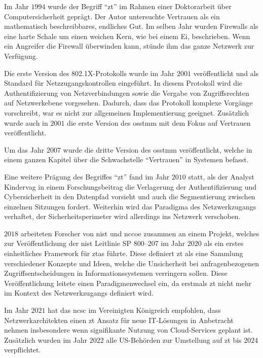 Im Jahr $1994$ wurde der Begriff \enquote{\ac{zt}} im Rahmen einer Doktorarbeit über Computersicherheit geprägt.
Der Autor untersuchte Vertrauen als ein mathematisch beschreibbares, endliches Gut.\autocite[\vglf][]{marsh-1994}
Im selben Jahr wurden Firewalls als eine harte Schale um einen weichen Kern, wie bei einem Ei, beschrieben.
Wenn ein Angreifer die Firewall überwinden kann, stünde ihm das ganze Netzwerk zur Verfügung. \autocite[\vglf][]{world-1994}

Die erste Version des 802.1X-Protokolls\autocite[\vglf][]{IEEE-2001} wurde im Jahr $2001$ veröffentlicht und als Standard für Netzzugangskontrollen eingeführt.
In diesem Protokoll wird die Authentifizierung von Netzverbindungen sowie die Vergabe von Zugriffsrechten auf Netzwerkebene vorgesehen.
Dadurch, dass das Protokoll komplexe Vorgänge vorschreibt, war es nicht zur allgemeinen Implementierung geeignet.\autocite[\vglf][]{zscaler-2022b}
Zusätzlich wurde auch in $2001$ die erste Version des \ac{osstmm} mit dem Fokus auf Vertrauen veröffentlicht.\autocite[\vglf][]{osstmm-2001}

Um das Jahr $2007$ wurde die dritte Version des \ac{osstmm} veröffentlicht, welche in einem ganzen Kapitel über die Schwachstelle \enquote{Vertrauen} in Systemen befasst.\autocite[\vglf][]{osstmm-2010}

Eine weitere Prägung des Begriffes \enquote{\ac{zt}} fand im Jahr $2010$ statt, als der Analyst Kindervag in einem Forschungsbeitrag die Verlagerung der Authentifizierung und Cybersicherheit in den Datenpfad vorsieht und auch die Segmentierung zwischen einzelnen Sitzungen fordert.
Weiterhin wird das Paradigma des Netzwerkzugangs verhaftet, der Sicherheitsperimeter wird allerdings ins Netzwerk verschoben.\autocites[\vglf][]{zscaler-2022b}[\vglf][]{kindervag-2010}

$2018$ arbeiteten Forscher von \ac{nist} und \ac{nccoe} zusammen an einem Projekt, welches zur Veröffentlichung der \ac{nist} Leitlinie SP 800--207\autocite{NIST:800207} im Jahr $2020$ als ein erstes einheitliches Framework für \acp{zta} führte.
Diese definiert \ac{zt} als eine Sammlung verschiedener Konzepte und Ideen, welche die Unsicherheit bei anfragenbezogenen Zugriffsentscheidungen in Informationssystemen verringern sollen.
Diese Veröffentlichung leitete einen Paradigmenwechsel ein, da erstmals \ac{zt} nicht mehr im Kontext des Netzwerkzugangs definiert wird.\autocite[\vglf][]{zscaler-2022b}

Im Jahr $2021$ hat das \ac{ncsc} im Vereinigten Königreich empfohlen, dass Netzwerkarchitekten einen \ac{zt} Ansatz für neue IT-Lösungen in Anbetracht nehmen insbesondere wenn signifikante Nutzung von Cloud-Services geplant ist.\autocite{ncsc-2021}
Zusätzlich wurden im Jahr $2022$ alle US-Behörden zur Umstellung auf \ac{zt} bis $2024$ verpflichtet.\autocite[\vglf][]{zscaler-2022b}


